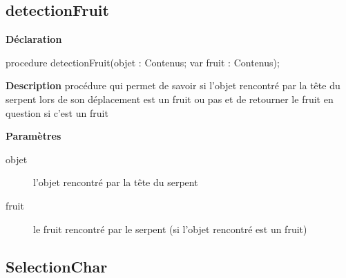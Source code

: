 \documentclass{report}
\newif\ifpdf
\begin{document}
\subsection*{detectionFruit}
\fi
\label{Jouer-detectionFruit}
\begin{list}{}{
\setlength{\itemindent}{0cm}
\setlength{\listparindent}{0cm}
\setlength{\leftmargin}{\evensidemargin}
\addtolength{\leftmargin}{\tmplength}
\settowidth{\labelsep}{X}
\addtolength{\leftmargin}{\labelsep}
\setlength{\labelwidth}{\tmplength}
}
\item[\textbf{Déclaration}\hfill]
\ifpdf
\begin{flushleft}
\fi
\begin{ttfamily}
procedure detectionFruit(objet : Contenus; var fruit : Contenus);\end{ttfamily}

\ifpdf
\end{flushleft}
\fi

\par
\item[\textbf{Description}]
procédure qui permet de savoir si l'objet rencontré par la tête du serpent lors de son déplacement est un fruit ou pas et de retourner le fruit en question si c'est un fruit  \par
\item[\textbf{Paramètres}]
\begin{description}
\item[objet] l'objet rencontré par la tête du serpent
\item[fruit] le fruit rencontré par le serpent (si l'objet rencontré est un fruit)
\end{description}


\end{list}
\ifpdf
\subsection*{\large{\textbf{SelectionChar}}\normalsize\hspace{1ex}\hrulefill}
\else
\end{document}
